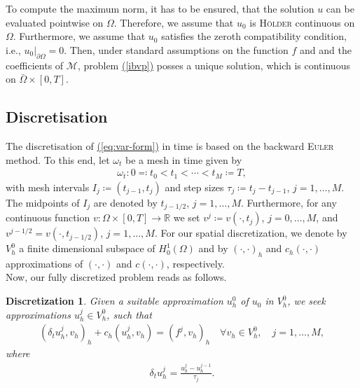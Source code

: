 \documentclass[11pt, a4paper]{article}
\newtheorem{disc}{Discretization}
\renewcommand{\eqref}[1]{\hyperref[#1]{(\ref{#1})}}  %
\newcommand{\pt}{\partial}
\newcommand{\scal}[2]{\left(#1,#2\right)}
\newcommand{\mM}{\mathcal{M}}
\begin{document}
	To compute the maximum norm, it has to be ensured, that the solution \(u\) can be evaluated pointwise on $\Omega$. Therefore, we assume that $u_0$ is \textsc{Hölder} continuous on $\Omega$. Furthermore, we assume that \(u_0\) satisfies the zeroth compatibility condition, i.e., \mbox{$u_0|_{\pt \Omega} = 0$}. Then, under standard assumptions on the function $f$ and and the coefficients of $\mM$, problem \eqref{ibvp} posses a unique solution, which is continuous on \mbox{$\bar{\Omega} \times [0,T]$}.
	
	\subsection{Discretisation} \label{subsec:disc}
	The discretisation of \eqref{eq:var-form} in time is based on the backward \textsc{Euler} method. To this end, let $\omega_t$ be a mesh in time given by
	\begin{gather*}
		\omega_t: 0 \eqqcolon t_0 < t_1 < \cdots < t_M \coloneqq T,
	\end{gather*}
	with mesh intervals \mbox{$I_j \coloneqq (t_{j-1}, t_j)$} and step sizes \mbox{$\tau_j \coloneqq t_j - t_{j-1}$}, $j=1,\dots, M$. The midpoints of $I_j$ are denoted by $t_{j-1/2}$, $j=1,\dots,M$. Furthermore, for any continuous function \mbox{$v: \Omega \times [0,T] \to \mathbb{R}$} we set \mbox{$v^j \coloneqq v(\cdot, t_j)$}, $j=0,\dots,M$, and \mbox{\(v^{j-1/2} = v(\cdot, t_{j-1/2})\)}, \(j=1,\dots,M\). For our spatial discretization, we denote by $V^0_h$ a finite dimensional subspace of $H^1_0(\Omega)$ and by $\scal{\cdot}{\cdot}_h$ and $c_h\scal{\cdot}{\cdot}$ approximations of $\scal{\cdot}{\cdot}$ and $c\scal{\cdot}{\cdot}$, respectively. \\  
	
	Now, our fully discretized problem reads as follows. 
	\begin{disc}\label{disc:euler-fem}
		Given a suitable approximation \(u^0_h\) of \(u_0\) in \(V^0_h\), we seek approximations \mbox{$u^j_h \in V^0_h$}, such that
		\begin{gather}\label{eq:bdf-fem-disc}
			\scal{\delta_t u^j_h}{v_h}_h + c_h\scal{u^j_h}{v_h} = \scal{f^j}{v_h}_h \quad \forall v_h \in V^0_h, \quad j=1,\dots,M,
		\end{gather}
		where
		\begin{gather*}
			\delta_t u^j_h = \frac{u^j_h - u^{j-1}_h}{\tau_j}.
		\end{gather*}
	\end{disc}
	
\end{document}
